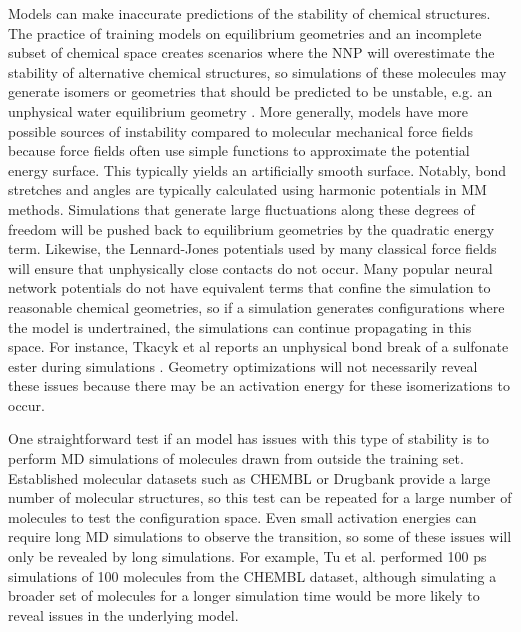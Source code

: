 \documentclass[9pt,bestpractices]{livecoms}
\begin{document}
Models can make inaccurate predictions of the stability of chemical structures.
The practice of training models on equilibrium geometries and an incomplete subset
of chemical space creates scenarios where the NNP will overestimate the
stability of alternative chemical structures, so simulations of these molecules
may generate isomers or geometries that should be predicted to be unstable, e.g. an 
unphysical water equilibrium geometry \cite{wiederTeachingFreeEnergy2021}.
More generally, models have more possible sources of instability compared to molecular
mechanical force fields because force fields often use simple functions to
approximate the potential energy surface. This typically yields an artificially
smooth surface. Notably, bond stretches and angles are typically calculated
using harmonic potentials in MM methods. Simulations that generate large
fluctuations along these degrees of freedom will be pushed back to equilibrium
geometries by the quadratic energy term. Likewise, the Lennard-Jones potentials
used by many classical force fields will ensure that unphysically close contacts
do not occur. Many popular neural network potentials do not have equivalent
terms that confine the simulation to reasonable chemical geometries, so if a
simulation generates configurations where the model is undertrained, the
simulations can continue propagating in this space. For instance, Tkacyk et al
reports an unphysical bond break of a sulfonate ester during simulations
\cite{tkaczykUsingNeuralNetwork2023}. Geometry optimizations will not
necessarily reveal these issues because there may be an activation energy for
these isomerizations to occur.

One straightforward test if an model has issues with this type of stability is to
perform MD simulations of molecules drawn from outside the training set.
Established molecular datasets such as CHEMBL or Drugbank provide a large number
of molecular structures, so this test can be repeated for a large number of
molecules to test the configuration space. Even small activation energies can
require long MD simulations to observe the transition, so some of these issues
will only be revealed by long simulations. For example, Tu et al. performed 100
ps simulations of 100 molecules from the CHEMBL dataset, although simulating a
broader set of molecules for a longer simulation time would be more likely to
reveal issues in the underlying model.
\end{document}
